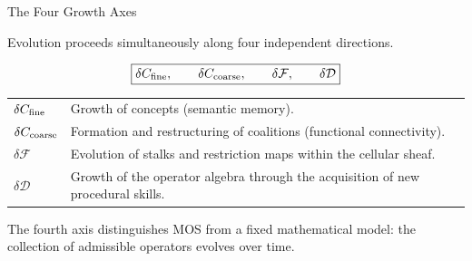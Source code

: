 \begin{mosbox}{The Four Growth Axes}

\BodyFont

Evolution proceeds simultaneously along four independent directions.

\[
\boxed{
\delta C_{\rm fine},
\qquad
\delta C_{\rm coarse},
\qquad
\delta\mathcal F,
\qquad
\delta\mathcal D
}
\]

\vspace{4mm}

\begin{center}

\begin{tabular}{p{4cm}p{10.8cm}}

$\delta C_{\rm fine}$

&

Growth of concepts (semantic memory).

\\[3mm]

$\delta C_{\rm coarse}$

&

Formation and restructuring of coalitions
(functional connectivity).

\\[3mm]

$\delta\mathcal F$

&

Evolution of stalks and restriction maps within the cellular sheaf.

\\[3mm]

$\delta\mathcal D$

&

Growth of the operator algebra through the acquisition of new
procedural skills.

\end{tabular}

\end{center}

The fourth axis distinguishes MOS from a fixed mathematical model:
the collection of admissible operators evolves over time.

\end{mosbox}


